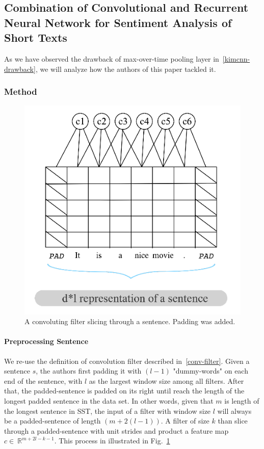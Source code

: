 \subsection{Combination of Convolutional and Recurrent Neural Network for Sentiment Analysis of Short Texts}\label{cnn-rnn}
As we have observed the drawback of max-over-time pooling layer in~\ref{kimcnn-drawback}, we will analyze how the authors of this paper tackled it.

\subsubsection{Method}
\begin{figure}[H]
	\centering
\includegraphics[scale=0.5]{figure/conv-word}
	\caption{A convoluting filter slicing through a sentence. 
	Padding was added.}
	\label{fig:conv-word}
\end{figure}

\paragraph{Preprocessing Sentence} We re-use the definition of convolution filter described in~\ref{conv-filter}.
Given a sentence \(s\), the authors first padding it with \((l-1)\) "dummy-words" on each end of the sentence, with \(l\) as the largest window size among all filters.
After that, the padded-sentence is padded on its right until reach the length of the longest padded sentence in the data set.
In other words, given that \(m\) is length of the longest sentence in SST, the input of a filter with window size \(l\) will always be a padded-sentence of length \((m + 2(l-1))\).
A filter of size \(k\) than slice through a padded-sentence with unit strides and product a feature map \(c \in \ \mathbb{R}^{m + 2l - k - 1}\).
This process in illustrated in Fig.~\ref{fig:conv-word}

